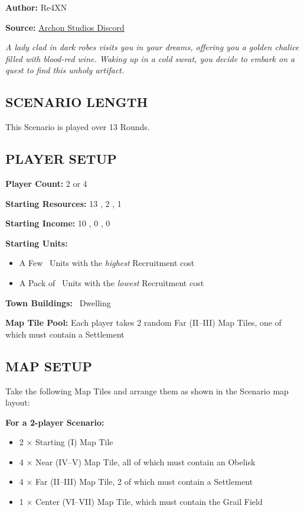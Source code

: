 
\begin{multicols*}{2}

\textbf{Author:} Re4XN

\textbf{Source:} \href{https://discord.com/channels/740870068178649108/1239631918643941509}{Archon Studios Discord}

\textit{A lady clad in dark robes visits you in your dreams, offering you a golden chalice filled with blood-red wine. Waking up in a cold sweat, you decide to embark on a quest to find this unholy artifact.}

\subsection*{\MakeUppercase{Scenario Length}}
This Scenario is played over 13 Rounds.

\subsection*{\MakeUppercase{Player Setup}}
\textbf{Player Count:} 2 or 4

\textbf{Starting Resources:} 13 , 2 , 1 

\textbf{Starting Income:} 10 , 0 , 0 

\textbf{Starting Units:}
\begin{itemize}
  \item A Few \bronze\ Units with the \textit{highest} Recruitment cost
  \item A Pack of \bronze\ Units with the \textit{lowest} Recruitment cost
\end{itemize}

\textbf{Town Buildings:} \bronze\ Dwelling

\textbf{Map Tile Pool:} Each player takes 2 random Far (II--III) Map Tiles, one of which must contain a Settlement

\subsection*{\MakeUppercase{Map Setup}}
Take the following Map Tiles and arrange them as shown in the Scenario map layout:

\textbf{For a 2-player Scenario:}
\begin{itemize}
  \item 2 × Starting (I) Map Tile
  \item 4 × Near (IV--V) Map Tile, all of which must contain an Obelisk
  \item 4 × Far (II--III) Map Tile, 2 of which must contain a Settlement
  \item 1 × Center (VI--VII) Map Tile, which must contain the Grail Field
\end{itemize}


\end{multicols*}
